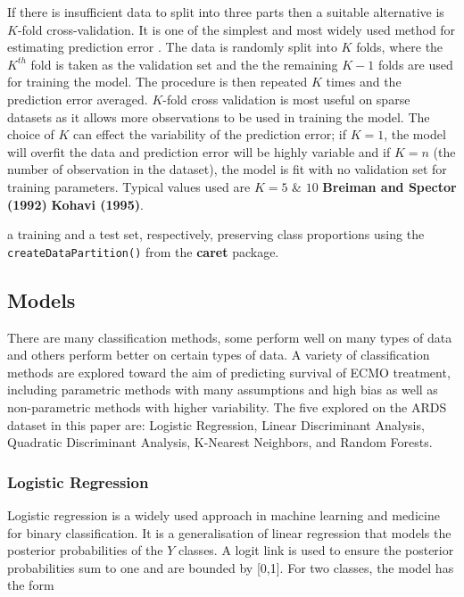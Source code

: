\documentclass[12pt,]{article}
\begin{document}
If there is insufficient data to split into three parts then a suitable
alternative is \(K\)-fold cross-validation. It is one of the simplest
and most widely used method for estimating prediction error
\citep{hastie_elements_2009}. The data is randomly split into \(K\)
folds, where the \(K^{th}\) fold is taken as the validation set and the
the remaining \(K-1\) folds are used for training the model. The
procedure is then repeated \(K\) times and the prediction error
averaged. \(K\)-fold cross validation is most useful on sparse datasets
as it allows more observations to be used in training the model. The
choice of \(K\) can effect the variability of the prediction error; if
\(K=1\), the model will overfit the data and prediction error will be
highly variable and if \(K=n\) (the number of observation in the
dataset), the model is fit with no validation set for training
parameters. Typical values used are \(K=5\) \& \(10\)
\citep{hastie_elements_2009} \textbf{Breiman and Spector (1992)}
\textbf{Kohavi (1995)}.

a training and a test set, respectively, preserving class proportions
using the \texttt{createDataPartition()} from the \textbf{caret}
package.

\subsection{Models}\label{models}

There are many classification methods, some perform well on many types
of data and others perform better on certain types of data. A variety of
classification methods are explored toward the aim of predicting
survival of ECMO treatment, including parametric methods with many
assumptions and high bias as well as non-parametric methods with higher
variability. The five explored on the ARDS dataset in this paper are:
Logistic Regression, Linear Discriminant Analysis, Quadratic
Discriminant Analysis, K-Nearest Neighbors, and Random Forests.

\subsubsection{Logistic Regression}\label{logistic-regression}

Logistic regression is a widely used approach in machine learning and
medicine for binary classification. It is a generalisation of linear
regression that models the posterior probabilities of the \(Y\) classes.
A logit link is used to ensure the posterior probabilities sum to one
and are bounded by {[}0,1{]}. For two classes, the model has the form
\end{document}
